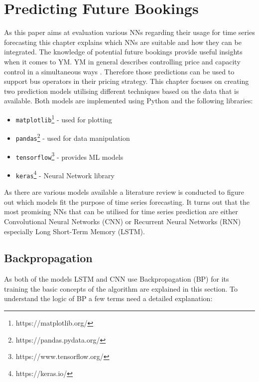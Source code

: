%
%
% 
% 
% 

\chapter{Predicting Future Bookings}
\label{chap:predict}
As this paper aims at evaluation various NNs regarding their usage for time series forecasting this chapter explains which NNs are suitable and how they can be integrated. The knowledge of potential future bookings provide useful insights when it comes to YM. YM in general describes controlling price and capacity control in a simultaneous ways \cite{yield_m}. Therefore those predictions can be used to support bus operators in their pricing strategy. This chapter focuses on creating two prediction models utilising different techniques based on the data that is available. 
Both models are implemented using Python and the following libraries:
\begin{itemize}
\item  \verb|matplotlib|\footnote{https://matplotlib.org/} - used for plotting
\item \verb|pandas|\footnote{https://pandas.pydata.org/} - used for data manipulation 
\item \verb|tensorflow|\footnote{https://www.tensorflow.org/} - provides ML models
\item \verb|keras|\footnote{https://keras.io/} - Neural Network library
\end{itemize}

As there are various models available a literature review is conducted to figure out which models fit the purpose of time series forecasting. It turns out that the most promising NNs that can be utilised for time series prediction are either Convolutional Neural Networks (CNN) or Recurrent Neural Networks (RNN) especially Long Short-Term Memory (LSTM)\cite{nn_1}\cite{nn_2}\cite{lstm_1}\cite{lstm_2}\cite{rnn_time_series_predict}.

\section{Backpropagation}
\label{sec:bp}

As both of the models LSTM and CNN use Backpropagation (BP) for its training the basic concepts of the algorithm are explained in this section. To understand the logic of BP a few terms need a detailed explanation: 
